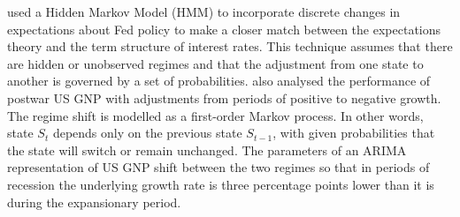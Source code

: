 \documentclass[12pt, a4paper, oneside]{article} %
\begin{document}

\citet{hamilton1988rational} used a Hidden Markov Model (HMM) to incorporate discrete changes in expectations about Fed policy to make a closer match between the expectations theory and the term structure of interest rates.  This technique assumes that there are hidden or unobserved regimes and that the adjustment from one state to another is governed by a set of probabilities.  \citet{Hamilton1989} also analysed the performance of postwar US GNP with adjustments from periods of positive to negative growth. The regime shift is modelled as a first-order Markov process.  In other words, state $S_t$ depends only on the previous state $S_{t-1}$, with given probabilities that the state will switch or remain unchanged.  The parameters of an ARIMA representation of US GNP shift between the two regimes so that in periods of recession the underlying growth rate is three percentage points lower than it is during the expansionary period.   




\end{document}
